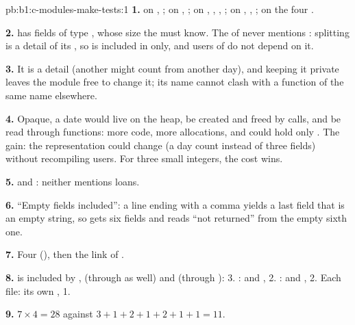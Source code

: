 \begin{solution}{pb:b1:c-modules-make-tests:1}
\textbf{1.}  on , ;  on , ; 
on , , , ;  on ,
, ;  on the four .

\textbf{2.}  has fields of type , whose size the  must know. The 
of  never mentions : splitting is a detail of its , so  is included in
 only, and users of  do not depend on it.

\textbf{3.} It is a detail (another  might count from another day), and keeping it private leaves the
module free to change it; its name cannot clash with a function of the same name elsewhere.

\textbf{4.} Opaque, a date would live on the heap, be created and freed by calls, and be read through functions: more
code, more allocations, and  could hold only . The gain: the representation could change (a
day count instead of three fields) without recompiling users. For three small integers, the cost wins.

\textbf{5.}  and : neither mentions loans.

\textbf{6.} ``Empty fields included'': a line ending with a comma yields a last field that is an empty string, so
 gets six fields and reads ``not returned'' from the empty sixth one.

\textbf{7.} Four  (), then the link of .

\textbf{8.}  is included by ,  (through  as well) and
 (through ): 3. :  and , 2. :
 and , 2. Each  file: its own , 1.

\textbf{9.} $7 \times 4 = 28$  against $3 + 1 + 2 + 1 + 2 + 1 + 1 = 11$.


\end{solution}
